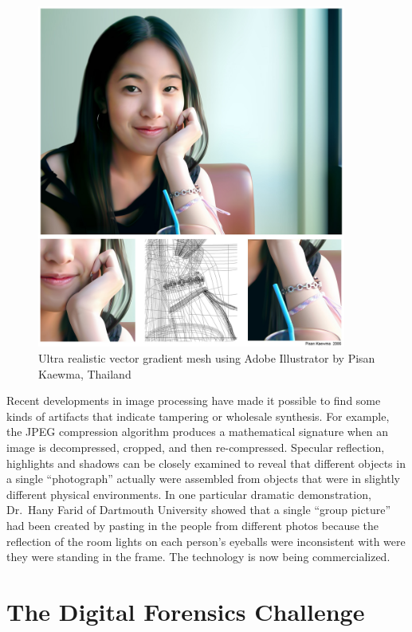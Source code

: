 \begin{figure}
\includegraphics[width=4in]{art/a1336.jpg}
\caption{Ultra realistic vector gradient mesh using Adobe Illustrator by Pisan Kaewma, Thailand}\label{ultra-realistic}
\end{figure}

Recent developments in image processing have made it
possible to find some kinds of artifacts that indicate tampering or wholesale synthesis. For example,
the JPEG compression algorithm produces a mathematical signature when an
image is decompressed, cropped, and then re-compressed. Specular 
reflection, highlights and shadows can be closely examined to reveal
that different objects in a single ``photograph'' actually were
assembled from objects that were in 
slightly different physical environments. In one particular dramatic
demonstration, Dr.\ Hany Farid of Dartmouth University showed that a single ``group picture''
had been created by pasting in the people from different photos
because the reflection of the room lights on each person's eyeballs
were inconsistent with were they were standing in the frame. The technology is now
being commercialized\citep{farid07}.


\section{The Digital Forensics Challenge}

